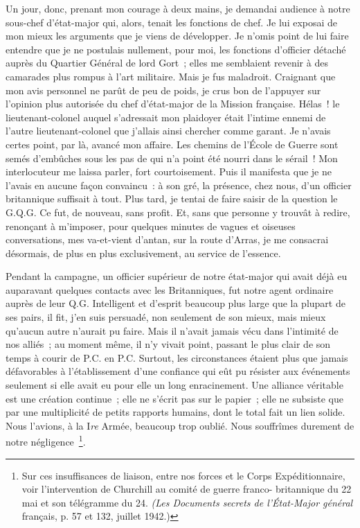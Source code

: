 \documentclass[french,twoside]{book} %
\begin{document}
Un jour, donc, prenant mon courage à deux mains, je demandai audience à notre sous-chef d’état-major qui, alors, tenait les fonctions de chef. Je lui exposai de mon mieux les arguments que je viens de développer. Je n’omis point de lui faire entendre que je ne postulais nullement, pour moi, les fonctions d’officier détaché auprès du Quartier Général de lord Gort ; elles me semblaient revenir à des camarades plus rompus à l’art militaire. Mais je fus maladroit. Craignant que mon avis personnel ne parût de peu de poids, je crus bon de l’appuyer sur l’opinion plus autorisée du chef d’état-major de la Mission française. Hélas ! le lieutenant-colonel auquel s’adressait mon plaidoyer était l’intime ennemi de l’autre lieutenant-colonel que j’allais ainsi chercher comme garant. Je n’avais certes point, par là, avancé mon affaire. Les chemins de l’École de Guerre sont semés d’embûches sous les pas de qui n’a point été nourri dans le sérail ! Mon interlocuteur me laissa parler, fort courtoisement. Puis il manifesta que je ne l’avais en aucune façon convaincu : à son gré, la présence, chez nous, d’un officier britannique suffisait à tout. Plus tard, je tentai de faire saisir de la question le G.Q.G. Ce fut, de nouveau, sans profit. Et, sans que personne y trouvât à redire, renonçant à m’imposer, pour quelques minutes de vagues et oiseuses conversations, mes va-et-vient d’antan, sur la route d’Arras, je me consacrai désormais, de plus en plus exclusivement, au service de l’essence.\par
Pendant la campagne, un officier supérieur de notre état-major qui avait déjà eu auparavant quelques contacts avec les Britanniques, fut notre agent ordinaire auprès de leur Q.G. Intelligent et d’esprit beaucoup plus large que la plupart de ses pairs, il   fit, j’en suis persuadé, non seulement de son mieux, mais mieux qu’aucun autre n’aurait pu faire. Mais il n’avait jamais vécu dans l’intimité de nos alliés ; au moment même, il n’y vivait point, passant le plus clair de son temps à courir de P.C. en P.C. Surtout, les circonstances étaient plus que jamais défavorables à l’établissement d’une confiance qui eût pu résister aux événements seulement si elle avait eu pour elle un long enracinement. Une alliance véritable est une création continue ; elle ne s’écrit pas sur le papier ; elle ne subsiste que par une multiplicité de petits rapports humains, dont le total fait un lien solide. Nous l’avions, à la I\emph{re} Armée, beaucoup trop oublié. Nous souffrîmes durement de notre négligence \footnote{ Sur ces insuffisances de liaison, entre nos forces et le Corps Expéditionnaire, voir l’intervention de Churchill au comité de guerre franco- britannique du 22 mai et son télégramme du 24. \emph{(Les Documents secrets de l’État-Major général} français, p. 57 et 132, juillet 1942.)}.\par
\end{document}

